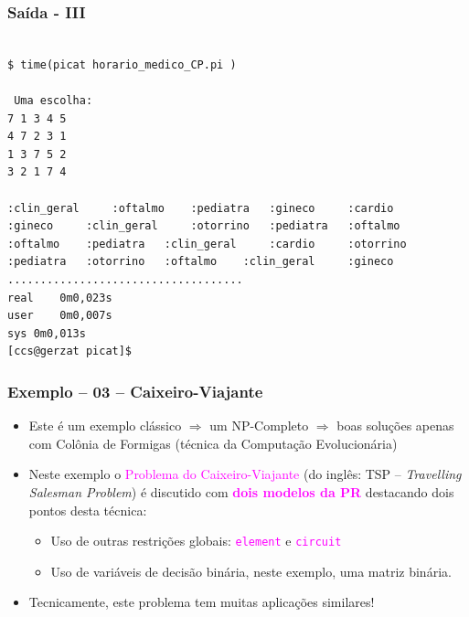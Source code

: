 \begin{frame}[fragile]

\frametitle{Saída - III}

\begin{footnotesize}
\begin{verbatim}

$ time(picat horario_medico_CP.pi )

 Uma escolha:
7 1 3 4 5 
4 7 2 3 1 
1 3 7 5 2 
3 2 1 7 4 

:clin_geral 	:oftalmo 	:pediatra 	:gineco 	:cardio 	
:gineco 	:clin_geral 	:otorrino 	:pediatra 	:oftalmo 	
:oftalmo 	:pediatra 	:clin_geral 	:cardio 	:otorrino 	
:pediatra 	:otorrino 	:oftalmo 	:clin_geral 	:gineco 	
....................................
real	0m0,023s
user	0m0,007s
sys	0m0,013s
[ccs@gerzat picat]$ 
\end{verbatim}
  
\end{footnotesize}
\end{frame}
\begin{frame}[fragile] 

\frametitle{Exemplo -- 03 -- Caixeiro-Viajante}

\begin{itemize}
\item Este é um exemplo clássico $\Rightarrow $ um NP-Completo $\Rightarrow $ boas soluções
apenas com Colônia de Formigas (técnica da Computação Evolucionária)

\pause
\item Neste exemplo o \textcolor{magenta}{Problema do Caixeiro-Viajante}
 (do inglês: TSP -- \textit{Travelling Salesman Problem}) é discutido com \textcolor{magenta}{\textbf{dois modelos da PR}} 
 destacando dois pontos desta técnica:

\begin{itemize}
  \item  Uso de outras restrições globais: \textcolor{magenta}{\texttt{element}} e \textcolor{magenta}{\texttt{circuit}}
  \item Uso de variáveis de decisão binária, neste exemplo, uma matriz binária. 
\end{itemize}

\pause
\item Tecnicamente, este problema tem muitas aplicações similares! 
\end{itemize}

\end{frame}

